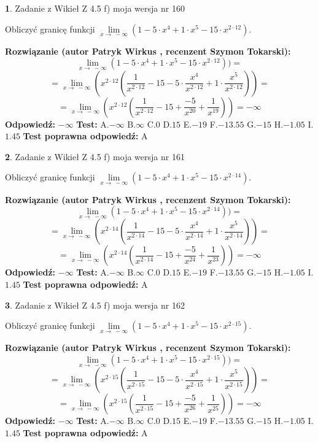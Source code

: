 \documentclass[12pt, a4paper]{article}
\theoremstyle{definition} %
\newtheorem{zad}{}
\newcommand{\zadStart}[1]{\begin{zad}#1\newline}
\newcommand{\zadStop}{\end{zad}}
\newcommand{\rozwStart}[2]{\noindent \textbf{Rozwiązanie (autor #1 , recenzent #2): }\newline}
\newcommand{\rozwStop}{\newline}
\newcommand{\odpStart}{\noindent \textbf{Odpowiedź:}\newline}
\newcommand{\odpStop}{\newline}
\newcommand{\testStart}{\noindent \textbf{Test:}\newline}
\newcommand{\testStop}{\newline}
\newcommand{\kluczStart}{\noindent \textbf{Test poprawna odpowiedź:}\newline}
\newcommand{\kluczStop}{\newline}
\begin{document}
\zadStart{Zadanie z Wikieł Z 4.5 f) moja wersja nr 160}


Obliczyć granicę funkcji  $\lim\limits_{x\to\ -\infty}(1 - 5 \cdot x^{4}+1 \cdot x^{5}- 15 \cdot x^{2\cdot12})$.
\zadStop
\rozwStart{Patryk Wirkus}{Szymon Tokarski}
$$\lim\limits_{x\to\ -\infty}(1 - 5 \cdot x^{4}+1 \cdot x^{5}- 15 \cdot x^{2\cdot12}))=$$
$$=\lim\limits_{x\to\ -\infty}(x^{2\cdot12}(\frac{1}{x^{2\cdot12}}-15 -5 \cdot \frac{x^{4}}{x^{2\cdot12}}+1 \cdot \frac{x^{5}}{x^{2\cdot12}}))=$$
$$=\lim\limits_{x\to\ -\infty}(x^{2\cdot12}(\frac{1}{x^{2\cdot12}}-15 + \frac{-5}{x^{20}}+ \frac{1}{x^{19}}))=-\infty$$
\rozwStop
\odpStart
$-\infty$
\odpStop
\testStart
A.$-\infty$ B.$\infty$ C.$0$ D.$15$ E.$-19$
F.$-13.55$ G.$-15$
H.$-1.05$
I.$1.45$
\testStop
\kluczStart
A
\kluczStop



\zadStart{Zadanie z Wikieł Z 4.5 f) moja wersja nr 161}


Obliczyć granicę funkcji  $\lim\limits_{x\to\ -\infty}(1 - 5 \cdot x^{4}+1 \cdot x^{5}- 15 \cdot x^{2\cdot14})$.
\zadStop
\rozwStart{Patryk Wirkus}{Szymon Tokarski}
$$\lim\limits_{x\to\ -\infty}(1 - 5 \cdot x^{4}+1 \cdot x^{5}- 15 \cdot x^{2\cdot14}))=$$
$$=\lim\limits_{x\to\ -\infty}(x^{2\cdot14}(\frac{1}{x^{2\cdot14}}-15 -5 \cdot \frac{x^{4}}{x^{2\cdot14}}+1 \cdot \frac{x^{5}}{x^{2\cdot14}}))=$$
$$=\lim\limits_{x\to\ -\infty}(x^{2\cdot14}(\frac{1}{x^{2\cdot14}}-15 + \frac{-5}{x^{24}}+ \frac{1}{x^{23}}))=-\infty$$
\rozwStop
\odpStart
$-\infty$
\odpStop
\testStart
A.$-\infty$ B.$\infty$ C.$0$ D.$15$ E.$-19$
F.$-13.55$ G.$-15$
H.$-1.05$
I.$1.45$
\testStop
\kluczStart
A
\kluczStop



\zadStart{Zadanie z Wikieł Z 4.5 f) moja wersja nr 162}


Obliczyć granicę funkcji  $\lim\limits_{x\to\ -\infty}(1 - 5 \cdot x^{4}+1 \cdot x^{5}- 15 \cdot x^{2\cdot15})$.
\zadStop
\rozwStart{Patryk Wirkus}{Szymon Tokarski}
$$\lim\limits_{x\to\ -\infty}(1 - 5 \cdot x^{4}+1 \cdot x^{5}- 15 \cdot x^{2\cdot15}))=$$
$$=\lim\limits_{x\to\ -\infty}(x^{2\cdot15}(\frac{1}{x^{2\cdot15}}-15 -5 \cdot \frac{x^{4}}{x^{2\cdot15}}+1 \cdot \frac{x^{5}}{x^{2\cdot15}}))=$$
$$=\lim\limits_{x\to\ -\infty}(x^{2\cdot15}(\frac{1}{x^{2\cdot15}}-15 + \frac{-5}{x^{26}}+ \frac{1}{x^{25}}))=-\infty$$
\rozwStop
\odpStart
$-\infty$
\odpStop
\testStart
A.$-\infty$ B.$\infty$ C.$0$ D.$15$ E.$-19$
F.$-13.55$ G.$-15$
H.$-1.05$
I.$1.45$
\testStop
\kluczStart
A
\kluczStop
\end{document}
